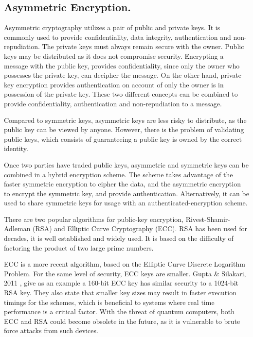 \subsection{Asymmetric Encryption.}  \label{crypto:assymetric}

Asymmetric cryptography utilizes a pair of public and private keys. It is commonly used to provide confidentiality, data integrity, authentication and non-repudiation.
The private keys must always remain secure with the owner. Public keys may be distributed as it does not compromise security. Encrypting a message with the public key, provides confidentiality, since only the owner who possesses the private key, can decipher the message. On the other hand, private key encryption provides authentication on account of only the owner is in possession of the private key. These two different concepts can be combined to provide confidentiality, authentication and non-repudiation to a message.

Compared to symmetric keys, asymmetric keys are less risky to distribute, as the public key can be viewed by anyone. However, there is the problem of validating public keys, which consists of guaranteeing a public key is owned by the correct identity.

Once two parties have traded public keys, asymmetric and symmetric keys can be combined in a hybrid encryption scheme. The scheme takes advantage of the faster symmetric encryption to cipher the data, and the asymmetric encryption to encrypt the symmetric key, and provide authentication. Alternatively, it can be used to share symmetric keys for usage with an authenticated-encryption scheme.

There are two popular algorithms for public-key encryption, Rivest-Shamir-Adleman (RSA) and Elliptic Curve Cryptography (ECC).
RSA has been used for decades, it is well established and widely used. It is based on the difficulty of factoring the product of two large prime numbers.

ECC is a more recent algorithm, based on the Elliptic Curve Discrete Logarithm Problem. For the same level of security, ECC keys are smaller. Gupta \& Silakari, 2011  \cite{eccoverrsa}, give as an example a 160-bit ECC key has similar security to a 1024-bit RSA key. They also state that smaller key sizes may result in faster execution timings for the schemes, which is beneficial to systems where real time performance is a critical factor.
With the threat of quantum computers, both ECC and RSA could become obsolete in the future, as it is vulnerable to brute force attacks from such devices.

